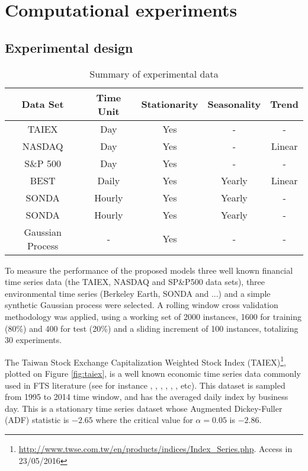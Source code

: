 \chapter[Computational experiments]{Computational experiments} \label{chap:results} 


\section{Experimental design}

\begin{table}[htb]
\begin{tabular}{|c|c|c|c|c|} \hline
\textbf{Data Set} & \textbf{Time Unit} & \textbf{Stationarity} & \textbf{Seasonality} & \textbf{Trend}  \\ \hline
TAIEX & Day & Yes & - & -  \\ \hline
NASDAQ & Day & Yes & - & Linear \\ \hline
S\&P 500 & Day & Yes & -  & -  \\ \hline
BEST & Daily & Yes & Yearly & Linear  \\ \hline
SONDA & Hourly & Yes & Yearly &  - \\ \hline
SONDA & Hourly & Yes & Yearly &  -  \\ \hline
Gaussian Process & - & Yes & - & -  \\ \hline
\end{tabular}
\caption{Summary of experimental data}
\label{tab:datasets}
\end{table}

To measure the performance of the proposed models three well known financial time series data (the TAIEX, NASDAQ and SP\&P500 data sets), three environmental time series (Berkeley Earth, SONDA and ...) and a simple synthetic Gaussian process were selected. A rolling window cross validation methodology \cite{Tashman2000} was applied, using a working set of 2000 instances, 1600 for training (80\%) and 400 for test (20\%) and a sliding increment of 100 instances, totalizing 30 experiments.

The Taiwan Stock Exchange Capitalization Weighted Stock Index (TAIEX)\footnote{\url{http://www.twse.com.tw/en/products/indices/Index_Series.php}. Access in 23/05/2016}, plotted on Figure \ref{fig:taiex}, is a well known economic time series data commonly used in FTS literature (see for instance \cite{yu2005weighted}, \cite{Chen2011}, \cite{Bajestani2011},  \cite{Lee2013}, \cite{Chen2015a},  \cite{JavedaniSadaei2016c}, etc). This dataset is sampled from 1995 to 2014 time window, and has the averaged daily index by business day. This is a stationary time series dataset whose Augmented Dickey-Fuller (ADF) statistic is $-2.65$ where the critical value for $\alpha = 0.05$ is $-2.86$.


